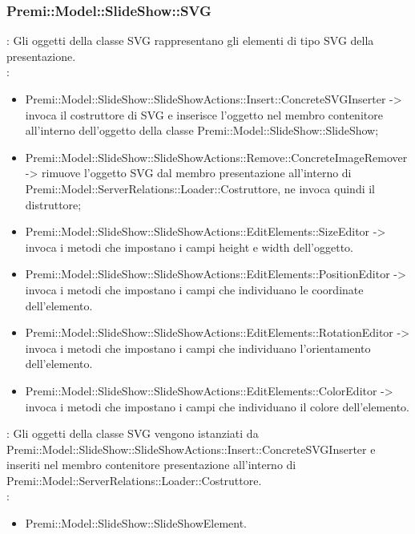 {                    \subsubsection{Premi::Model::SlideShow::SVG}{
				\textbf{\tipo}: Gli oggetti della classe SVG rappresentano gli elementi di tipo SVG della presentazione.\\
				\textbf{\relaz}: 
				\begin{itemize}
					\item Premi::Model::SlideShow::SlideShowActions::Insert::ConcreteSVGInserter -> invoca il costruttore di SVG e inserisce l’oggetto nel membro contenitore all’interno dell’oggetto della classe Premi::Model::SlideShow::SlideShow;
                    \item Premi::Model::SlideShow::SlideShowActions::Remove::ConcreteImageRemover -> rimuove l’oggetto SVG dal membro presentazione all’interno di Premi::Model::ServerRelations::Loader::Costruttore, ne invoca quindi il distruttore;
                    \item Premi::Model::SlideShow::SlideShowActions::EditElements::SizeEditor -> invoca i metodi che impostano i campi height e width dell'oggetto.
                    \item Premi::Model::SlideShow::SlideShowActions::EditElements::PositionEditor -> invoca i metodi che impostano i campi che individuano le coordinate dell'elemento.
                    \item Premi::Model::SlideShow::SlideShowActions::EditElements::RotationEditor -> invoca i metodi che impostano i campi che individuano l'orientamento dell'elemento.
                    \item Premi::Model::SlideShow::SlideShowActions::EditElements::ColorEditor -> invoca i metodi che impostano i campi che individuano il colore dell'elemento.
				\end{itemize}	
                \textbf{\interfacce}: Gli oggetti della classe SVG vengono istanziati da Premi::Model::SlideShow::SlideShowActions::Insert::ConcreteSVGInserter e inseriti nel membro contenitore presentazione all’interno di Premi::Model::ServerRelations::Loader::Costruttore.\\
                \textbf{\base}: 
                    \begin{itemize}
                    \item Premi::Model::SlideShow::SlideShowElement.
                    \end{itemize}
                    }
}
